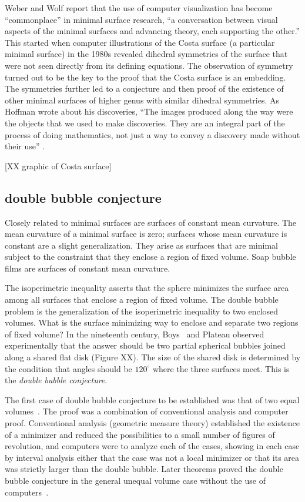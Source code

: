 \documentclass{llncs}
\begin{document}
Weber and Wolf \cite{WW11} report that the use of computer
visualization has become ``commonplace'' in minimal surface research,
``a conversation between visual aspects of the minimal surfaces and
advancing theory, each supporting the other.''  This started when
computer illustrations of the Costa surface (a particular minimal
surface) in the 1980s revealed dihedral symmetries of the surface that
were not seen directly from its defining equations.  The observation
of symmetry turned out to be the key to the proof that the Costa
surface is an embedding.  The symmetries further led to a conjecture
and then proof of the existence of other minimal surfaces of higher
genus with similar dihedral symmetries.  As Hoffman wrote about his discoveries, ``The
images produced along the way were the objects that we used to make
discoveries. They are an integral part of the process of doing
mathematics, not just a way to convey a discovery made without their
use'' \cite{Hoffman}.

[XX graphic of Costa surface]


\subsection{double bubble conjecture}

Closely related to minimal surfaces are surfaces of constant mean
curvature.  The mean curvature of a minimal surface is zero; surfaces
whose mean curvature is constant are a slight generalization.  They
arise as surfaces that are minimal subject to the constraint that
they enclose a region of fixed volume.  Soap bubble films are
surfaces of constant mean curvature.  

The isoperimetric inequality asserts that the sphere minimizes the
surface area among all surfaces that enclose a region of fixed volume.
The double bubble problem is the generalization of the isoperimetric
inequality to two enclosed volumes.  What is the surface minimizing way
to enclose and separate two regions of fixed volume?  In the
nineteenth century, Boys~\cite{Boy1890} and Plateau observed
experimentally that the answer should be two partial spherical bubbles
joined along a shared flat disk (Figure XX).  The size of the shared
disk is determined by the condition that angles should be $120^\circ$
where the three surfaces meet.  This is the {\it double bubble
  conjecture}.

The first case of double bubble conjecture to be established was that
of two equal volumes~\cite{HHS95}.  The proof was a combination of conventional
analysis and computer proof.  Conventional analysis (geometric measure
theory) established the existence of a minimizer and reduced the
possibilities to a small number of figures of revolution, and
computers were to analyze each of the cases, showing in each case by
interval analysis either that the case was not a local minimizer or
that its area was strictly larger than the double bubble.  Later
theorems proved the double bubble conjecture in the general unequal
volume case without the use of computers~\cite{HMRR}.
\end{document}
